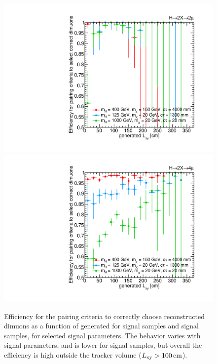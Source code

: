 \begin{figure}[p]
  \centering
  \includegraphics[width=\DSquareWidth]{figures/displaced/PC_Lxy_2Mu2J_Mul.pdf}
  \hspace*{-2em}
  \includegraphics[width=\DSquareWidth]{figures/displaced/PC_Lxy_4Mu_Mul.pdf}
  \caption[Efficiency for the pairing criteria to correctly choose reconstructed dimuons as a function of generated \Lxy for \twoMu and \fourMu signal samples.]{Efficiency for the pairing criteria to correctly choose reconstructed dimuons as a function of generated \Lxy for  \twoMu signal samples and  \fourMu signal samples, for selected signal parameters. The behavior varies with signal parameters, and is lower for \fourMu signal samples, but overall the efficiency is high outside the tracker volume ($L_{\mathrm{xy}} > 100\,\text{cm}$).}
  \label{fig:dd:PC_Eff}
\end{figure}
